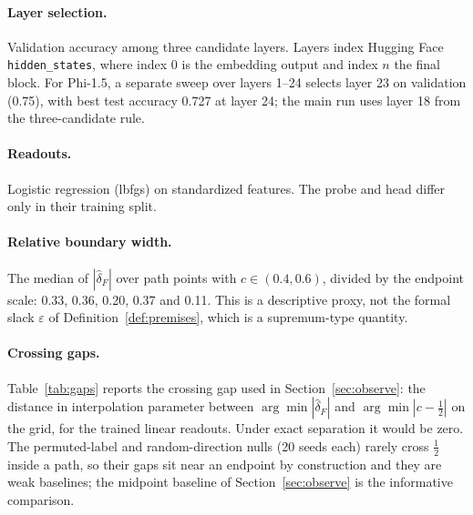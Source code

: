 \documentclass[10pt]{article}
\theoremstyle{definition}
\theoremstyle{remark}
\newcommand{\conf}{c}
\newcommand{\dFhat}{\hat\delta_{\!F}}
\begin{document}
\paragraph{Layer selection.} Validation accuracy among three candidate
layers. Layers index Hugging Face \texttt{hidden\_states}, where index 0 is the
embedding output and index $n$ the final block. For Phi-1.5, a separate
sweep over layers 1--24 selects layer 23 on validation (0.75), with best
test accuracy 0.727 at layer 24; the main
run uses layer 18 from the three-candidate rule.

\paragraph{Readouts.} Logistic regression (lbfgs) on standardized
features. The probe and head differ only in their training split.

\paragraph{Relative boundary width.} The median of $|\dFhat|$ over path
points with $\conf\in(0.4,0.6)$, divided by the endpoint scale: 0.33,
0.36, 0.20, 0.37 and 0.11. This is a descriptive proxy, not the formal
slack $\varepsilon$ of Definition~\ref{def:premises}, which is a
supremum-type quantity.

\paragraph{Crossing gaps.}
Table~\ref{tab:gaps} reports the crossing gap used in
Section~\ref{sec:observe}: the distance in interpolation parameter between
$\arg\min|\dFhat|$ and $\arg\min|\conf-\tfrac12|$ on the grid, for the
trained linear readouts. Under exact separation it would be zero. The
permuted-label and random-direction nulls (20 seeds each) rarely cross
$\tfrac12$ inside a path, so their gaps sit near an endpoint by
construction and they are weak baselines; the midpoint baseline of
Section~\ref{sec:observe} is the informative comparison.
\end{document}
